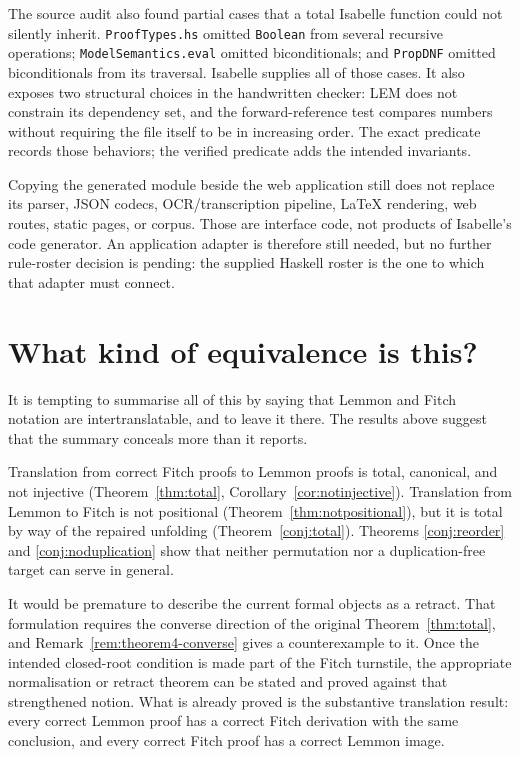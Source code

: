\documentclass[11pt]{article}
\theoremstyle{plain}
\theoremstyle{definition}
\theoremstyle{remark}
\begin{document}
The source audit also found partial cases that a total Isabelle function could
not silently inherit. \verb|ProofTypes.hs| omitted \verb|Boolean| from several
recursive operations; \texttt{ModelSemantics.}\allowbreak\texttt{eval}
omitted biconditionals; and
\verb|PropDNF| omitted biconditionals from its traversal. Isabelle supplies
all of those cases. It also exposes two structural choices in the handwritten
checker: LEM does not constrain its dependency set, and the forward-reference
test compares numbers without requiring the file itself to be in increasing
order. The exact predicate records those behaviors; the verified predicate
adds the intended invariants.

Copying the generated module beside the web application still does not replace
its parser, JSON codecs, OCR/transcription pipeline, LaTeX rendering, web
routes, static pages, or corpus. Those are interface code, not products of
Isabelle's code generator. An application adapter is therefore still needed,
but no further rule-roster decision is pending: the supplied Haskell roster is
the one to which that adapter must connect.

\section{What kind of equivalence is this?}\label{sec:equivalence}

It is tempting to summarise all of this by saying that Lemmon and Fitch
notation are intertranslatable, and to leave it there. The results above
suggest that the summary conceals more than it reports.

Translation from correct Fitch proofs to Lemmon proofs is total, canonical,
and not injective (Theorem~\ref{thm:total},
Corollary~\ref{cor:notinjective}). Translation from Lemmon to Fitch is not
positional (Theorem~\ref{thm:notpositional}), but it is total by way of the
repaired unfolding (Theorem~\ref{conj:total}). Theorems
\ref{conj:reorder} and \ref{conj:noduplication} show that neither permutation
nor a duplication-free target can serve in general.

It would be premature to describe the current formal objects as a retract.
That formulation requires the converse direction of the original
Theorem~\ref{thm:total}, and Remark~\ref{rem:theorem4-converse} gives a
counterexample to it. Once the intended closed-root condition is made part of
the Fitch turnstile, the appropriate normalisation or retract theorem can be
stated and proved against that strengthened notion. What is already proved is
the substantive translation result: every correct Lemmon proof has a correct
Fitch derivation with the same conclusion, and every correct Fitch proof has a
correct Lemmon image.
\end{document}
